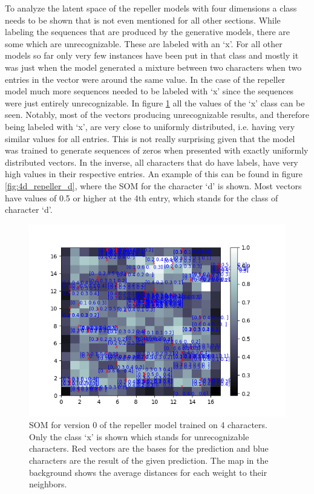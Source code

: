 To analyze the latent space of the repeller models with four dimensions a class needs to be shown that is not even mentioned for all other sections. While labeling the sequences that are produced by the generative models, there are some which are unrecognizable. These are labeled with an `x'. For all other models so far only very few instances have been put in that class and mostly it was just when the model generated a mixture between two characters when two entries in the vector were around the same value. In the case of the repeller model much more sequences needed to be labeled with `x' since the sequences were just entirely unrecognizable. In figure \ref{fig:4d_repeller_x} all the values of the `x' class can be seen. Notably, most of the vectors producing unrecognizable results, and therefore being labeled with `x', are very close to uniformly distributed, i.e. having very similar values for all entries. This is not really surprising given that the model was trained to generate sequences of zeros when presented with exactly uniformly distributed vectors. In the inverse, all characters that do have labels, have very high values in their respective entries. An example of this can be found in figure \ref{fig:4d_repeller_d}, where the SOM for the character `d' is shown. Most vectors have values of 0.5 or higher at the 4th entry, which stands for the class of character `d'. \\

\begin{figure}[!htb]
	\centering
	\includegraphics[width=\textwidth]{images/SOM_graphics/17x17_4d_repeller_v0/x.png}
	\caption{SOM for version 0 of the repeller model trained on 4 characters. Only the class `x' is shown which stands for unrecognizable characters. Red vectors are the bases for the prediction and blue characters are the result of the given prediction. The map in the background shows the average distances for each weight to their neighbors.}
	\label{fig:4d_repeller_x}
\end{figure}

